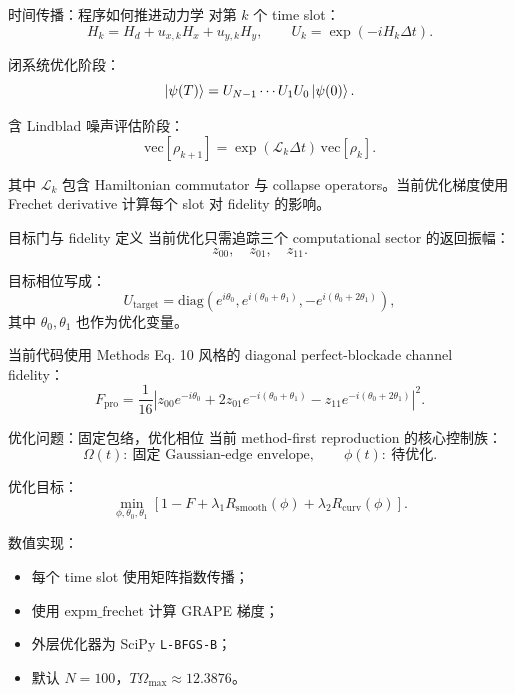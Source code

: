 \documentclass[aspectratio=169,11pt]{ctexbeamer}
\begin{document}
\begin{frame}{时间传播：程序如何推进动力学}
  对第 \(k\) 个 time slot：
  \[
    H_k=H_d+u_{x,k}H_x+u_{y,k}H_y,
    \qquad
    U_k=\exp(-iH_k\Delta t).
  \]

  闭系统优化阶段：
  \[
    \ket{\psi(T)}
    =
    U_{N-1}\cdots U_1U_0\ket{\psi(0)}.
  \]

  含 Lindblad 噪声评估阶段：
  \[
    \mathrm{vec}[\rho_{k+1}]
    =
    \exp(\mathcal{L}_k\Delta t)\,
    \mathrm{vec}[\rho_k].
  \]

  其中 \(\mathcal{L}_k\) 包含 Hamiltonian commutator 与 collapse operators。当前优化梯度使用 Frechet derivative 计算每个 slot 对 fidelity 的影响。
\end{frame}

\begin{frame}{目标门与 fidelity 定义}
  当前优化只需追踪三个 computational sector 的返回振幅：
  \[
  z_{00},\quad z_{01},\quad z_{11}.
  \]

  目标相位写成：
  \[
  U_{\mathrm{target}}
  =\mathrm{diag}\left(
    e^{i\theta_0},
    e^{i(\theta_0+\theta_1)},
    -e^{i(\theta_0+2\theta_1)}
  \right),
  \]
  其中 \(\theta_0,\theta_1\) 也作为优化变量。

  当前代码使用 Methods Eq. 10 风格的 diagonal perfect-blockade channel fidelity：
  \[
  F_{\mathrm{pro}}=\frac{1}{16}
  \left|
  z_{00}e^{-i\theta_0}
  +2z_{01}e^{-i(\theta_0+\theta_1)}
  -z_{11}e^{-i(\theta_0+2\theta_1)}
  \right|^2.
  \]
\end{frame}

\begin{frame}{优化问题：固定包络，优化相位}
  当前 method-first reproduction 的核心控制族：
  \[
    \Omega(t):\ \text{固定 Gaussian-edge envelope},
    \qquad
    \phi(t):\ \text{待优化}.
  \]

  优化目标：
  \[
    \min_{\phi,\theta_0,\theta_1}
    \left[1-F+\lambda_1 R_{\mathrm{smooth}}(\phi)
    +\lambda_2 R_{\mathrm{curv}}(\phi)\right].
  \]

  数值实现：
  \begin{itemize}
    \item 每个 time slot 使用矩阵指数传播；
    \item 使用 \(\mathrm{expm\_frechet}\) 计算 GRAPE 梯度；
    \item 外层优化器为 SciPy \texttt{L-BFGS-B}；
    \item 默认 \(N=100\)，\(T\Omega_{\max}\approx 12.3876\)。
  \end{itemize}
\end{frame}
\end{document}
